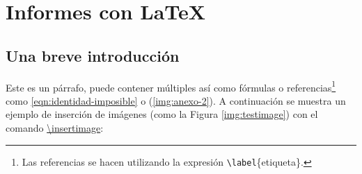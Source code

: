 %
%

\section{Informes con \LaTeX}

\subsection{Una breve introducción}
	
	Este es un párrafo, puede contener múltiples  así como fórmulas o referencias\footnote{Las referencias se hacen utilizando la expresión \texttt{\textbackslash label}\{etiqueta\}.} como \eqref{eqn:identidad-imposible} o (\ref{img:anexo-2}). A continuación se muestra un ejemplo de inserción de imágenes (como la Figura \ref{img:testimage}) con el comando \href{https://latex.ppizarror.com/informe.html#hlp-imagen}{\textbackslash insertimage}:


